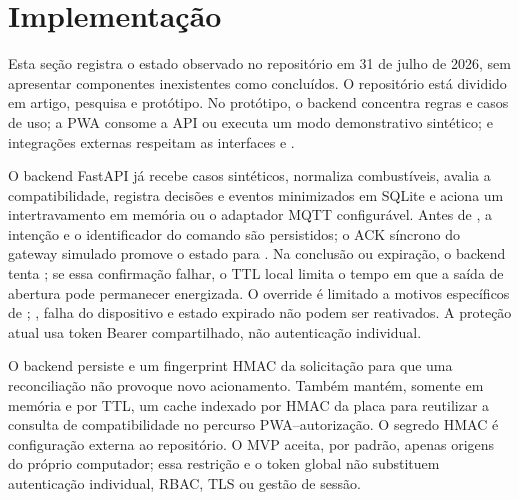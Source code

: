 \section{Implementação}
\label{sec:implementacao}

Esta seção registra o estado observado no repositório em 31 de julho de 2026,
sem apresentar componentes inexistentes como concluídos. O repositório está
dividido em artigo, pesquisa e protótipo. No protótipo, o backend concentra
regras e casos de uso; a PWA consome a API ou executa um modo demonstrativo
sintético; e integrações externas respeitam as interfaces
 e .

O backend FastAPI já recebe casos sintéticos, normaliza combustíveis, avalia a
compatibilidade, registra decisões e eventos minimizados em SQLite e aciona um
intertravamento em memória ou o adaptador MQTT configurável. Antes de
, a intenção
 e o identificador do comando são persistidos; o ACK
síncrono do gateway simulado promove o estado para . Na
conclusão ou expiração, o backend tenta ; se essa confirmação
falhar, o TTL local limita o tempo em que a saída de abertura pode permanecer
energizada. O override é limitado a motivos
específicos de ; , falha do dispositivo e
estado expirado não podem ser reativados. A proteção atual usa token Bearer
compartilhado, não autenticação individual.

O backend persiste  e um fingerprint HMAC da solicitação
para que uma reconciliação não provoque novo acionamento. Também mantém, somente
em memória e por TTL, um cache indexado por HMAC da placa para reutilizar a
consulta de compatibilidade no percurso PWA--autorização. O segredo HMAC é
configuração externa ao repositório. O MVP aceita, por padrão, apenas origens do
próprio computador; essa restrição e o token global não substituem autenticação
individual, RBAC, TLS ou gestão de sessão.


